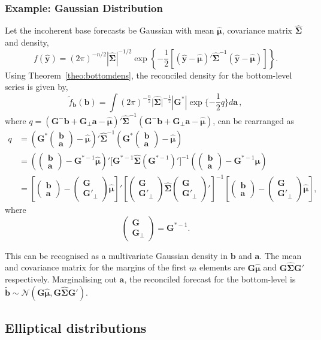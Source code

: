 \documentclass[12pt]{article}
\def\PQ{\begin{pmatrix}\bm{G}\\[-0.2cm]\bm{G}'_{\perp}\end{pmatrix}}
\def\bt{\begin{pmatrix}{\bm{b}}\\[-0.2cm]{\bm{a}}\end{pmatrix}}
\theoremstyle{definition}
\begin{document}
\subsubsection*{Example: Gaussian Distribution}

Let the incoherent base forecasts be Gaussian with mean $\hat{\bm{\mu}}$, covariance matrix $\hat{\bm{\Sigma}}$ and density,
\begin{equation}
f(\hat{\bm{y}})=(2\pi)^{-n/2}|\hat{\bm{\Sigma}}|^{-1/2}\exp\left\{-\frac{1}{2}\left[(\hat{\bm{y}}-\hat{\bm{\mu}})'\hat{\bm{\Sigma}}^{-1}(\hat{\bm{y}}-\hat{\bm{\mu}})\right]\right\}\nonumber.
\end{equation}
Using Theorem~\ref{theo:bottomdens}, the reconciled density for the bottom-level series is given by,
\begin{equation}
\tilde{f}_{\bm{b}}(\bm{b})=\int(2\pi)^{-\frac{n}{2}}\Big|\hat{\bm{\Sigma}}\Big|^{-\frac{1}{2}}|\bm{G^*}|\exp\{-\frac{1}{2}q\}d{\bm a}\nonumber\,,
\end{equation}
where $q=(\bm{G}^-{\bm{b}}+\bm{G}_{\perp}{\bm{a}}-\hat{\bm{\mu}})' \hat{\bm{\Sigma}}^{-1}(\bm{G}^-\bm{b}+\bm{G}_\perp\bm{a}-\hat{\bm{\mu}})$, can be rearranged as
\begin{align*}
	q& =
	\left(\bm{G}^*\bt-\hat{\bm{\mu}}\right)' \hat{\bm{\Sigma}}^{-1}\left(\bm{G}^*\bt-\hat{\bm{\mu}}\right)\\
	& =
	\left(\bt-\bm{G}^{*-1}\hat{\bm{\mu}}\right)' \Big[\bm{G}^{*-1}\hat{\bm{\Sigma}}\left(\bm{G}^{*-1}\right)'\Big]^{-1}
	\left(\bt-\bm{G}^{*-1}\hat{\bm{\mu}}\right)\\
    & =\left[\bt-\PQ\hat{\bm{\mu}}\right]' \left[\PQ\hat{\bm{\Sigma}}\PQ'\right]^{-1}\left[\bt-\PQ\hat{\bm{\mu}}\right],
\end{align*}
where 
\[
\begin{pmatrix}
\bm{G} \\\bm{G}_{\perp}
\end{pmatrix}=\bm{G}^{*-1}.
\]

This can be recognised as a multivariate Gaussian density in $\bm{b}$ and $\bm{a}$.  The mean and covariance matrix for the margins of the first $m$ elements are $\bm{G}\hat{\bm{\mu}}$ and $\bm{G}\hat{\bm{\Sigma}}\bm{G}'$ respectively.  Marginalising out $\bm {a}$, the reconciled forecast for the bottom-level is $\tilde{\bm{b}} \sim \mathcal{N}(\bm{G}\hat{\bm{\mu}}, \bm{G}\hat{\bm{\Sigma}}\bm{G}')$.

\subsection{Elliptical distributions}
\end{document}
